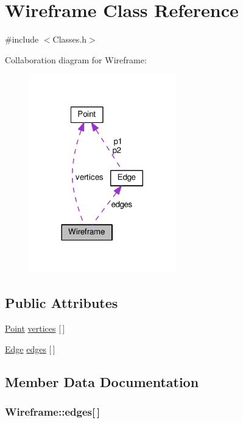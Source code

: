 \hypertarget{class_wireframe}{}\section{Wireframe Class Reference}
\label{class_wireframe}


{\ttfamily \#include $<$Classes.\+h$>$}



Collaboration diagram for Wireframe\+:
\nopagebreak
\begin{figure}[H]
\begin{center}
\leavevmode
\includegraphics[width=180pt]{class_wireframe__coll__graph}
\end{center}
\end{figure}
\subsection*{Public Attributes}
\begin{DoxyCompactItemize}
\item 
\hyperlink{class_point}{Point} \hyperlink{class_wireframe_aabbceba0ec194b6ec51c6881a97cd46a}{vertices} \mbox{[}$\,$\mbox{]}
\item 
\hyperlink{class_edge}{Edge} \hyperlink{class_wireframe_a909822e1ff36d03b8b86052b7008bc98}{edges} \mbox{[}$\,$\mbox{]}
\end{DoxyCompactItemize}


\subsection{Member Data Documentation}
\subsubsection[{\texorpdfstring{edges}{edges}}]{ Wireframe\+::edges\mbox{[}$\,$\mbox{]}}\hypertarget{class_wireframe_a909822e1ff36d03b8b86052b7008bc98}{}\label{class_wireframe_a909822e1ff36d03b8b86052b7008bc98}
